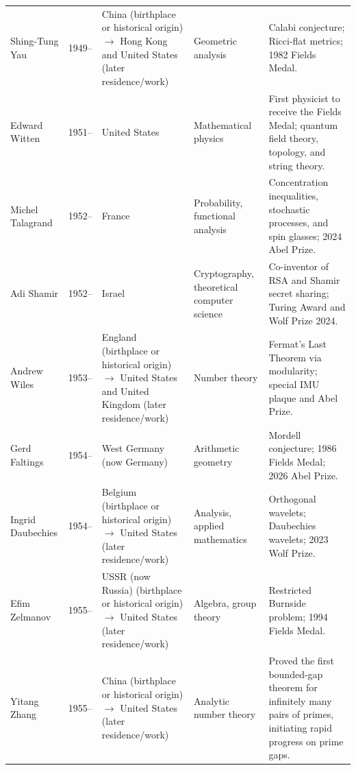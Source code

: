 {\begin{longtable}{@{}L{0.145\textwidth}L{0.09\textwidth}L{0.225\textwidth}L{0.14\textwidth}L{0.30\textwidth}@{}}
        Shing-Tung Yau
        & 1949--
        & China (birthplace or historical origin) \(\to\) Hong Kong and United States (later residence/work)
        & Geometric analysis
        & Calabi conjecture; Ricci-flat metrics; 1982 Fields Medal. \\

        Edward Witten
        & 1951--
        & United States
        & Mathematical physics
        & First physicist to receive the Fields Medal; quantum field theory,
          topology, and string theory. \\

        Michel Talagrand
        & 1952--
        & France
        & Probability, functional analysis
        & Concentration inequalities, stochastic processes, and spin glasses;
          2024 Abel Prize. \\

        Adi Shamir
        & 1952--
        & Israel
        & Cryptography, theoretical computer science
        & Co-inventor of RSA and Shamir secret sharing; Turing Award and Wolf
          Prize 2024. \\

        Andrew Wiles
        & 1953--
        & England (birthplace or historical origin) \(\to\) United States and United Kingdom (later residence/work)
        & Number theory
        & Fermat's Last Theorem via modularity; special IMU plaque and Abel
          Prize. \\

        Gerd Faltings
        & 1954--
        & West Germany (now Germany)
        & Arithmetic geometry
        & Mordell conjecture; 1986 Fields Medal; 2026 Abel Prize. \\

        Ingrid Daubechies
        & 1954--
        & Belgium (birthplace or historical origin) \(\to\) United States (later residence/work)
        & Analysis, applied mathematics
        & Orthogonal wavelets; Daubechies wavelets; 2023 Wolf Prize. \\

        Efim Zelmanov
        & 1955--
        & USSR (now Russia) (birthplace or historical origin) \(\to\) United States (later residence/work)
        & Algebra, group theory
        & Restricted Burnside problem; 1994 Fields Medal. \\

        Yitang Zhang
        & 1955--
        & China (birthplace or historical origin) \(\to\) United States (later residence/work)
        & Analytic number theory
        & Proved the first bounded-gap theorem for infinitely many pairs of
          primes, initiating rapid progress on prime gaps. \\


\end{longtable}}
